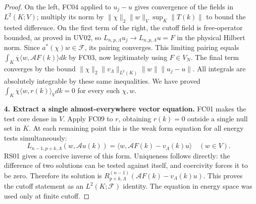 \documentclass[11pt,a4paper]{article}
\theoremstyle{remark}\newtheorem{remark}[theorem]{Remark}
\newcommand{\F}{\mathcal F}\newcommand{\Q}{\mathcal Q}\newcommand{\HH}{\mathcal H}
\begin{document}
\begin{proof}
On the left, FC04 applied to $u_j-u$ gives convergence of the fields in $L^2(K;V)$; multiply its norm by $\|\chi\|_2\|w\|_V\sup_K\|T(k)\|$ to bound the tested difference. On the first term of the right, the cutoff field is free-operator bounded, as proved in UV02, so $L_{n,p,\Lambda}u_j\to L_{n,p,\Lambda}u=F$ in the physical Hilbert norm. Since $a^*(\chi)w\in\F$, its pairing converges. This limiting pairing equals $\int_K\overline\chi\langle w,\mathcal AF(k)\rangle dk$ by FC03, now legitimately using $F\in V_N$. The final term converges by the bound
$\|\chi\|_2\|v_\Lambda\|_{L^2(K)}\|w\|\|u_j-u\|$.
All integrals are absolutely integrable by these same inequalities. We have proved
$\int_K\overline\chi\langle w,r(k)\rangle_Vdk=0$ for every such $\chi,w$.

\textbf{4. Extract a single almost-everywhere vector equation.}
FC01 makes the test core dense in $V$. Apply FC09 to $r$, obtaining $r(k)=0$ outside a single null set in $K$. At each remaining point this is the weak form equation for all energy tests simultaneously:
\begin{equation}
 L_{n-1,p+k,\Lambda}(w,\mathcal Au(k))
 =\langle w,\mathcal AF(k)-v_\Lambda(k)u\rangle
 \quad(w\in V).
 \label{eq:weakPT}
\end{equation}
RS01 gives a coercive inverse of this form. Uniqueness follows directly: the difference of two solutions can be tested against itself, and coercivity forces it to be zero. Therefore its solution is
$R_{p+k,\Lambda}^{(n-1)}(\mathcal AF(k)-v_\Lambda(k)u)$.
This proves the cutoff statement as an $L^2(K;\F)$ identity. The equation in energy space was used only at finite cutoff.


\end{proof}
\end{document}
